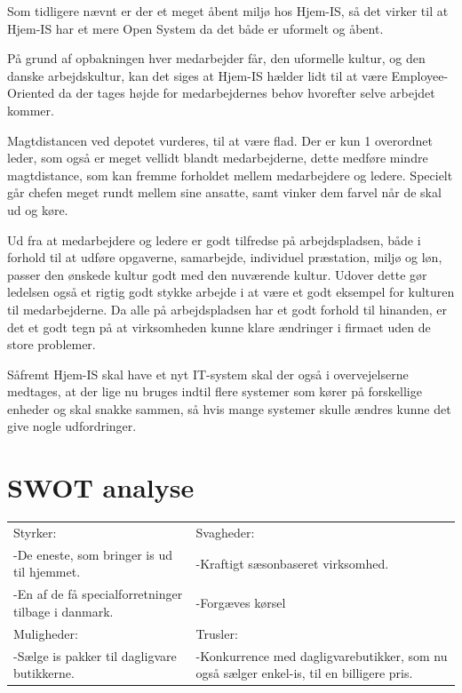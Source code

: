 Som tidligere nævnt er der et meget åbent miljø hos Hjem-IS, så det virker til at Hjem-IS har et mere Open System da det både er uformelt og åbent.

På grund af opbakningen hver medarbejder får, den uformelle kultur, og den danske arbejdskultur, kan det siges at Hjem-IS hælder lidt til at være Employee-Oriented da der tages højde for medarbejdernes behov hvorefter selve arbejdet kommer. 

Magtdistancen ved depotet vurderes, til at være flad. Der er kun 1 overordnet leder, som også er meget vellidt blandt medarbejderne, dette medføre mindre magtdistance, som kan fremme forholdet mellem medarbejdere og ledere. Specielt går chefen meget rundt mellem sine ansatte, samt vinker dem farvel når de skal ud og køre. 

Ud fra at medarbejdere og ledere er godt tilfredse på arbejdspladsen, både i forhold til at udføre opgaverne, samarbejde, individuel præstation, miljø og løn, passer den ønskede kultur godt med den nuværende kultur. Udover dette gør ledelsen også et rigtig godt stykke arbejde i at være et godt eksempel for kulturen til medarbejderne. Da alle på arbejdspladsen har et godt forhold til hinanden, er det et godt tegn på at virksomheden kunne klare ændringer i firmaet uden de store problemer. 

Såfremt Hjem-IS skal have et nyt IT-system skal der også i overvejelserne medtages, at der lige nu bruges indtil flere systemer som kører på forskellige enheder og skal snakke sammen, så hvis mange systemer skulle ændres kunne det give nogle udfordringer.

\section{SWOT analyse}
\begin{center}
\begin{tabular}{ |p{200pt}|p{200pt}| }
    \hline
    Styrker: & Svagheder: \\
    -De eneste, som bringer is ud til hjemmet. & -Kraftigt sæsonbaseret virksomhed. \\
    -En af de få specialforretninger tilbage i danmark. & -Forgæves kørsel \\
    \hline
    Muligheder: & Trusler: \\
    -Sælge is pakker til dagligvare butikkerne. & -Konkurrence med dagligvarebutikker, som nu også sælger enkel-is, til en billigere pris. \\
    \hline
\end{tabular}
\end{center}

